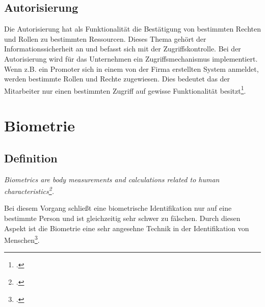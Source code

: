 \subsection{Autorisierung}
Die Autorisierung hat als Funktionalität die Bestätigung von bestimmten Rechten und Rollen zu bestimmten Ressourcen. Dieses Thema gehört der Informationssicherheit an und befasst sich mit der Zugriffskontrolle. Bei der Autorisierung wird für das Unternehmen ein Zugriffsmechanismus implementiert. Wenn z.B. ein Promoter sich in einem von der Firma erstellten System anmeldet, werden bestimmte Rollen und Rechte zugewiesen. Dies bedeutet das der Mitarbeiter nur einen bestimmten Zugriff auf gewisse Funktionalität besitzt\footcite{anmeldevorgangs}.


\section{Biometrie}
\subsection{Definition}
\begin{center}
	\textit{Biometrics are body measurements and calculations related to human characteristics\footcite{biometrie}.}
\end{center}

Bei diesem Vorgang schließt eine biometrische Identifikation nur auf eine bestimmte Person und ist gleichzeitig sehr schwer zu fälschen.
Durch diesen Aspekt ist die Biometrie eine sehr angesehne Technik in der Identifikation von Menschen\footcite{biometrie}.


